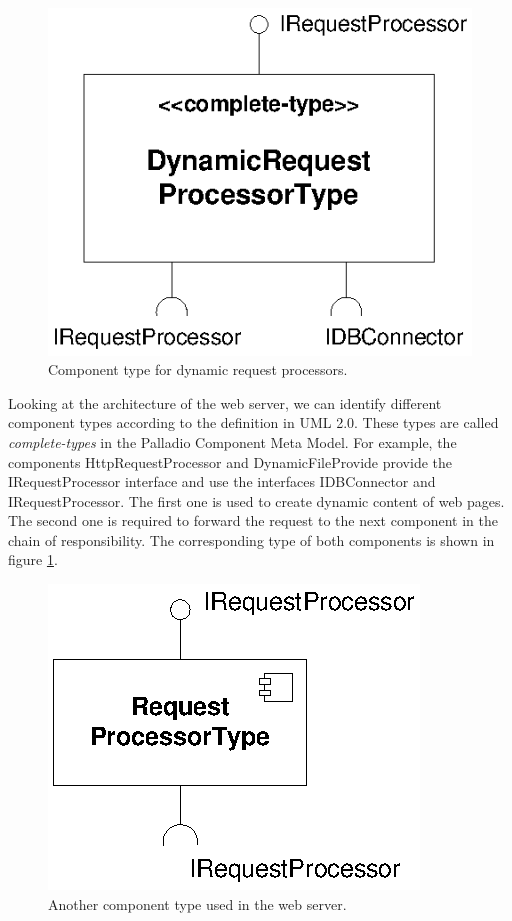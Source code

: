 \begin{figure}[htbp]
\centering
\includegraphics[scale=0.85]{example/DynamicRequestProcessorType}
\caption{Component type for dynamic request processors.}
\label{fig:DynamicRequestProcessorType}
\end{figure}

Looking at the architecture of the web server, we can identify different component types according to the definition in UML 2.0. These types are called \emph{complete-types} in the Palladio Component Meta Model. For example, the components HttpRequestProcessor and DynamicFileProvide provide the IRequestProcessor interface and use the interfaces IDBConnector and IRequestProcessor. The first one is used to create dynamic content of web pages. The second one is required to forward the request to the next component in the chain of responsibility. The corresponding type of both components is shown in figure \ref{fig:DynamicRequestProcessorType}.

\begin{figure}[htbp]
\centering
\includegraphics[scale=0.85]{example/RequestProcessorType}
\caption{Another component type used in the web server.}
\label{fig:RequestProcessorType}
\end{figure}

